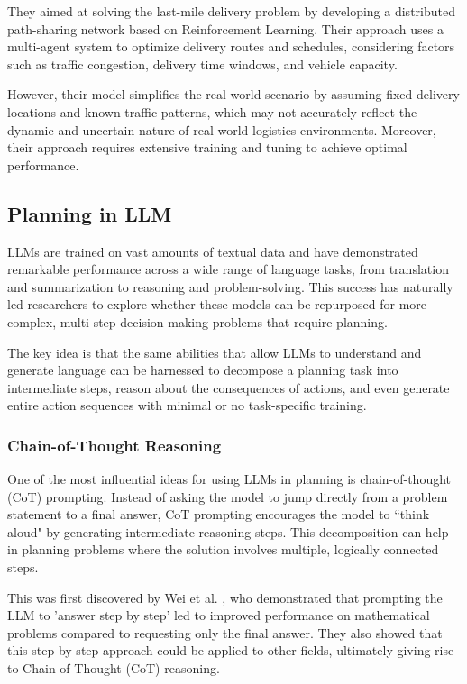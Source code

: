 They aimed at solving the last-mile delivery problem by developing a distributed
path-sharing network based on Reinforcement Learning. Their approach uses a
multi-agent system to optimize delivery routes and schedules, considering factors
such as traffic congestion, delivery time windows, and vehicle capacity.

However, their model simplifies the real-world scenario by assuming fixed
delivery locations and known traffic patterns, which may not accurately reflect the
dynamic and uncertain nature of real-world logistics environments. Moreover, their
approach requires extensive training and tuning to achieve optimal performance.

\subsection{Planning in LLM}

LLMs are trained on vast amounts of textual data and have demonstrated
remarkable performance across a wide range of language tasks, from translation and
summarization to reasoning and problem-solving. This success has naturally led
researchers to explore whether these models can be repurposed for more complex, multi-step
decision-making problems that require planning.

The key idea is that the same abilities that allow LLMs to understand and generate
language can be harnessed to decompose a planning task into intermediate steps,
reason about the consequences of actions, and even generate entire action sequences
with minimal or no task-specific training.

\subsubsection{Chain-of-Thought Reasoning}

One of the most influential ideas for using LLMs in planning is chain-of-thought
(CoT) prompting. Instead of asking the model to jump directly from a problem statement
to a final answer, CoT prompting encourages the model to ``think aloud" by generating
intermediate reasoning steps. This decomposition can help in planning problems
where the solution involves multiple, logically connected steps.

This was first discovered by Wei et al.
\cite{wei2023chainofthoughtpromptingelicitsreasoning}, who demonstrated that prompting
the LLM to 'answer step by step' led to improved performance on mathematical problems
compared to requesting only the final answer. They also showed that this step-by-step
approach could be applied to other fields, ultimately giving rise to Chain-of-Thought
(CoT) reasoning.

